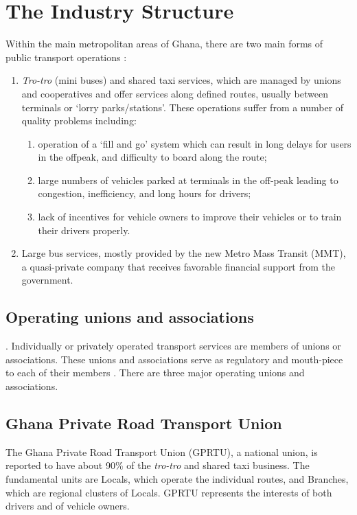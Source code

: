 \documentclass[oneside,12pt]{book}
\begin{document}
\section{The Industry Structure}
Within the main metropolitan areas of Ghana, there are two main forms of public transport operations \citep{finn2009new}:
\begin{enumerate}
\item \textit{Tro-tro} (mini buses) and shared taxi services, which are managed by unions and cooperatives and offer services along defined routes, usually between terminals or ‘lorry parks/stations’. These operations suffer from a number of quality problems including:

\begin{enumerate}
\item operation of a ‘fill and go’ system which can result in long delays for users in the offpeak, and difficulty to board along the route;
\item large numbers of vehicles parked at
terminals in the off-peak leading to congestion, inefficiency, and long hours for
drivers; 
\item lack of incentives for vehicle owners to improve their vehicles or to train their drivers properly.
\end{enumerate}

\item Large bus services, mostly provided by the new Metro Mass Transit (MMT), a quasi-private company that receives favorable financial support from the government.
\end{enumerate}

\subsection{Operating unions and associations}. 
Individually or privately operated transport services are members of unions or associations. These unions and associations serve as regulatory and mouth-piece to each of their members \citep{fouracre1994public}. There are three major operating unions and associations.

\subsection{Ghana Private Road Transport Union}
The Ghana Private Road Transport Union (GPRTU), a national union, is reported to have about 90\% of the \textit{tro-tro} and shared taxi business. The fundamental units are Locals, which operate the individual routes, and Branches, which are regional clusters of Locals. GPRTU represents the interests of both drivers and of vehicle owners.
\end{document}
